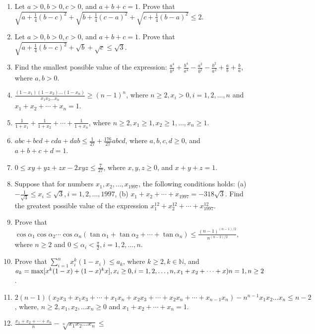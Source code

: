 \begin{enumerate}
\item Let $a > 0, b > 0, c > 0$, and $a + b + c = 1$. Prove that $\sqrt{a + \frac{1}{4}(b - c)^2} + \sqrt{b + \frac{1}{4}(c - a)^2}
  + \sqrt{c + \frac{1}{4}(b - a)^2}\leq 2$.
\item Let $a > 0, b > 0, c > 0$, and $a + b + c = 1$. Prove that $\sqrt{a + \frac{1}{4}(b - c)^2} + \sqrt{b} + \sqrt{c}\leq
  \sqrt{3}$.
\item Find the smallest possible value of the expression: $\frac{a^4}{b^4} + \frac{b^4}{a^4} - \frac{a^2}{b^2} - \frac{b^2}{a^2} +
  \frac{a}{b} + \frac{b}{a}$, where $a, b > 0$.
\item $\frac{(1 - x_1)(1 - x_2)\ldots(1 - x_n)}{x_1x_2\ldots x_n}\geq (n - 1)^n$, where $n\geq 2, x_i>0,  i = 1, 2, \ldots, n$ and
  $x_1 + x_2 + \cdots + x_n = 1$.
\item $\frac{1}{1 + x_1} + \frac{1}{1 + x_2} + \cdots + \frac{1}{1 + x_n}$, where $n\geq 2, x_1\geq 1, x_2\geq 1, \ldots, x_n\geq
  1$.
\item $abc + bcd + cda + dab\leq \frac{1}{27} + \frac{176}{27}abcd$, where $a, b, c, d\geq 0$, and $a + b + c + d = 1$.
\item $0\leq xy + yz + zx - 2xyz\leq \frac{7}{27}$, where $x, y, z\geq 0$, and $x + y + z = 1$.
\item Suppose that for numbers $x_1, x_2, \ldots, x_{1997}$, the following conditions holds: (a) $-\frac{1}{\sqrt{3}}\leq x_i \leq
  \sqrt{3}, i = 1, 2, \ldots, 1997$, (b) $x_1 + x_2 + \cdots + x_{1997} = -318\sqrt{3}$. Find the greatest possible value of the
  expression $x_1^{12} + x_2^{12} + \cdots + x_{1997}^{12}$.
\item Prove that $\cos\alpha_1\cos\alpha_2\cdots\cos\alpha_n(\tan\alpha_1 + \tan\alpha_2 + \cdots + \tan\alpha_n)\leq \frac{(n-
  1)^{(n - 1)/2}}{n^{(n - 2)/2}}$, where $n\geq 2$ and $0\leq \alpha_i<\frac{\pi}{2}, i = 1, 2, \ldots, n$.
\item Prove that $\displaystyle\sum_{i=1}^nx_i^k(1 - x_i)\leq a_k$, where $k\geq 2, k\in\mathbb{N}$, and $a_k = {\rm max}[x^k(1 -
  x) + (1 - x)^kx], x_i\geq 0, i=1, 2, \ldots, n, x_1 + x_2 + \cdots + x)n = 1, n\geq 2$.
\item $2(n - 1)(x_2x_3 + x_1x_3 + \cdots + x_1x_n + x_2x_3 + \cdots + x_2x_n + \cdots + x_{n - 1}x_n) - n^{n - 1}x_1x_2\ldots
  x_n\leq n - 2$, where, $n\geq 2, x_1, x_2, \ldots x_n\geq 0$ and $x_1 + x_2 + \cdots + x_n = 1$.
\item $\frac{x_1 + x_2 + \cdots + x_n}{n} - \sqrt[n]{x_1x_2\ldots x_n}\leq$


\end{enumerate}
